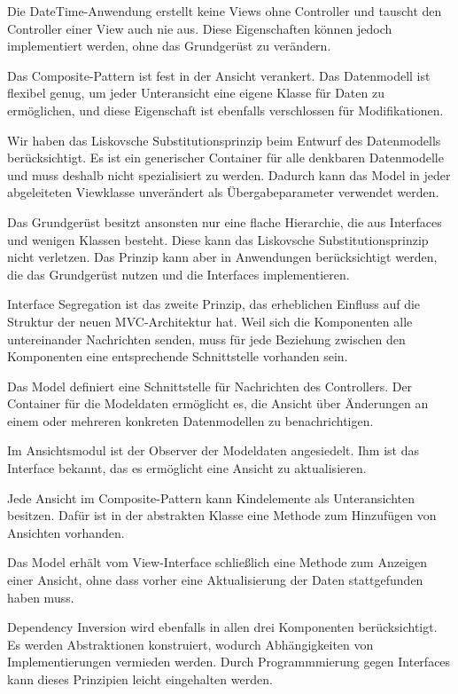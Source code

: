 \documentclass{vldb}
\begin{document}
Die DateTime-Anwendung erstellt keine Views ohne Controller und tauscht den Controller einer View auch nie aus. Diese Eigenschaften können jedoch implementiert werden, ohne das Grundgerüst zu verändern.

Das Composite-Pattern ist fest in der Ansicht verankert. Das Datenmodell ist flexibel genug, um jeder Unteransicht eine eigene Klasse für Daten zu ermöglichen, und diese Eigenschaft ist ebenfalls verschlossen für Modifikationen.

Wir haben das  Liskovsche Substitutionsprinzip beim Entwurf des Datenmodells berücksichtigt. Es ist ein generischer Container für alle denkbaren Datenmodelle und muss deshalb nicht spezialisiert zu werden. Dadurch kann das Model in jeder abgeleiteten Viewklasse unverändert als Über\-gabe\-para\-meter verwendet werden.

Das Grundgerüst besitzt ansonsten nur eine flache Hie\-rar\-chie, die aus Interfaces und wenigen Klassen besteht. Diese kann das Liskovsche Substitutionsprinzip nicht verletzen. Das Prinzip kann aber in Anwendungen berücksichtigt werden, die das Grundgerüst nutzen und die Interfaces implementieren.

Interface Segregation ist das zweite Prinzip, das er\-heb\-li\-chen Einfluss auf die Struktur der neuen MVC-Architektur hat. Weil sich die Komponenten alle untereinander Nach\-rich\-ten senden, muss für jede Beziehung zwischen den Komponenten eine entsprechende Schnittstelle vorhanden sein.

Das Model definiert eine Schnittstelle für Nachrichten des Controllers. Der Container für die Modeldaten ermöglicht es, die Ansicht über Änderungen an einem oder mehreren konkreten Datenmodellen zu benachrichtigen.

Im Ansichtsmodul ist der Observer der Modeldaten angesiedelt. Ihm ist das Interface bekannt, das es ermöglicht eine Ansicht zu aktualisieren.

Jede Ansicht im Composite-Pattern kann Kindelemente als Unteransichten besitzen. Dafür ist in der abstrakten Klasse eine Methode zum Hinzufügen von Ansichten vorhanden.

Das Model erhält vom View-Interface schließlich eine Methode zum Anzeigen einer Ansicht, ohne dass vorher eine Aktualisierung der Daten stattgefunden haben muss.

Dependency Inversion wird ebenfalls in allen drei Komponenten berücksichtigt. Es werden Abstraktionen konstruiert, wodurch Abhängigkeiten von Implementierungen vermieden werden. Durch Programmmierung gegen Interfaces kann dieses Prinzipien leicht eingehalten werden.
\end{document}
